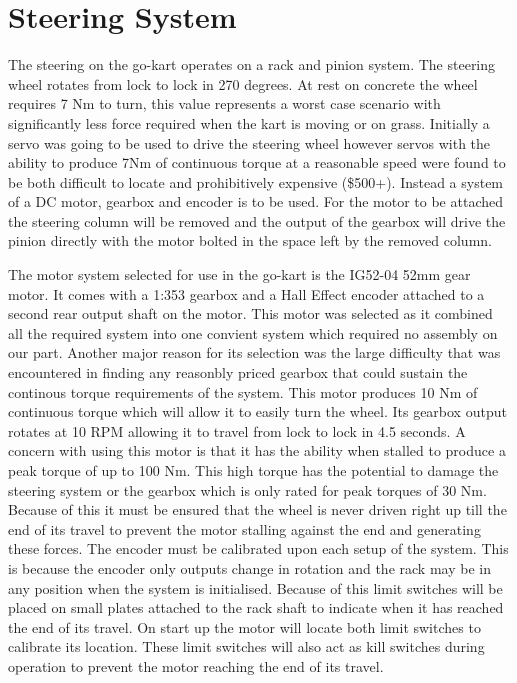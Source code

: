 \section{Steering System}

The steering on the go-kart operates on a rack and pinion system. The steering
wheel rotates from lock to lock in 270 degrees. At rest on concrete the wheel
requires 7 Nm to turn, this value represents a worst case scenario with
significantly less force required when the kart is moving or on grass. Initially
a servo was going to be used to drive the steering wheel however servos with the
ability to produce 7Nm of continuous torque at a reasonable speed were found to
be both difficult to locate and prohibitively expensive (\$500+). Instead a
system of a DC motor, gearbox and encoder is to be used. For the motor to be
attached the steering column will be removed and the output of the gearbox
will drive the pinion directly with the motor bolted in the space left by the
removed column. %

The motor system selected for use in the go-kart is the IG52-04 52mm gear motor.
It comes with a 1:353 gearbox and a Hall Effect encoder attached to a second
rear output shaft on the motor. This motor was selected as it combined all the
 required system into one convient system which required no assembly on our part.
 Another major reason for its selection was the large difficulty that was
 encountered in finding any reasonbly priced gearbox that could sustain the
 continous torque requirements of the system. This motor produces 10 Nm of continuous torque
which will allow it to easily turn the wheel. Its gearbox output rotates at 10
RPM allowing it to travel from lock to lock in 4.5 seconds. A concern with using
this motor is that it has the ability when stalled to produce a peak torque of
up to 100 Nm. This high torque has the potential to damage the steering system
or the gearbox which is only rated for peak torques of 30 Nm. Because of this it
must be ensured that the wheel is never driven right up till the end of its
travel to prevent the motor stalling against the end and generating these
forces. The encoder must be calibrated upon each setup of the system. This is
because the encoder only outputs change in rotation and the rack may be in any
position when the system is initialised. Because of this limit switches will be
placed on small plates attached to the rack shaft to indicate when it has
reached the end of its travel. On start up the motor will locate both limit
switches to calibrate its location. These limit switches will also act as kill
switches during operation to prevent the motor reaching the end of its travel.


